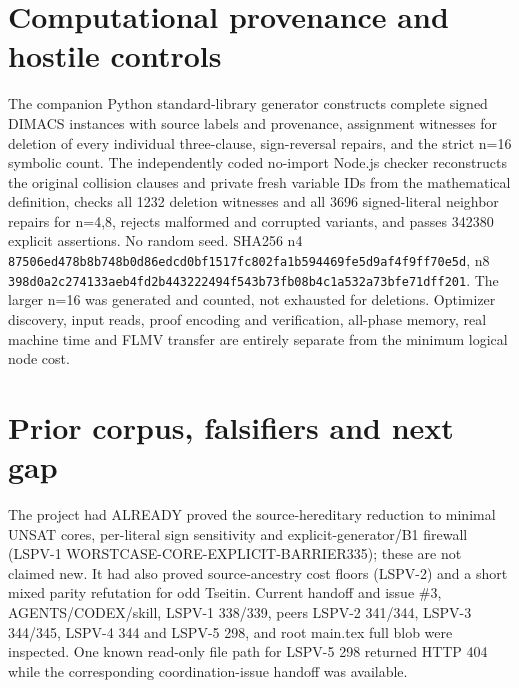 \documentclass[11pt]{article}
\begin{document}
\section{Computational provenance and hostile controls}
The companion Python standard-library generator constructs complete signed DIMACS instances with source labels and provenance, assignment witnesses for deletion of every individual three-clause, sign-reversal repairs, and the strict n=16 symbolic count. The independently coded no-import Node.js checker reconstructs the original collision clauses and private fresh variable IDs from the mathematical definition, checks all 1232 deletion witnesses and all 3696 signed-literal neighbor repairs for n=4,8, rejects malformed and corrupted variants, and passes 342380 explicit assertions. No random seed. SHA256 n4 \texttt{87506ed478b8b748b0d86edcd0bf1517fc802fa1b594469fe5d9af4f9ff70e5d}, n8 \texttt{398d0a2c274133aeb4fd2b443222494f543b73fb08b4c1a532a73bfe71dff201}. The larger n=16 was generated and counted, not exhausted for deletions. Optimizer discovery, input reads, proof encoding and verification, all-phase memory, real machine time and FLMV transfer are entirely separate from the minimum logical node cost.

\section{Prior corpus, falsifiers and next gap}
The project had ALREADY proved the source-hereditary reduction to minimal UNSAT cores, per-literal sign sensitivity and explicit-generator/B1 firewall (LSPV-1 WORSTCASE-CORE-EXPLICIT-BARRIER335); these are not claimed new. It had also proved source-ancestry cost floors (LSPV-2) and a short mixed parity refutation for odd Tseitin. Current handoff and issue \#3, AGENTS/CODEX/skill, LSPV-1 338/339, peers LSPV-2 341/344, LSPV-3 344/345, LSPV-4 344 and LSPV-5 298, and root main.tex full blob were inspected. One known read-only file path for LSPV-5 298 returned HTTP 404 while the corresponding coordination-issue handoff was available.
\end{document}
